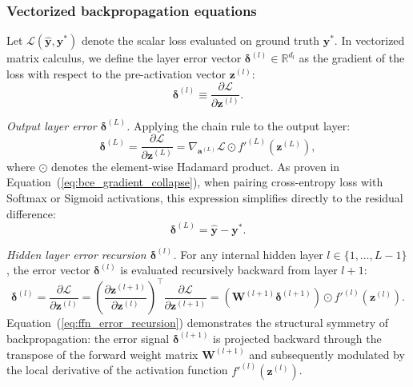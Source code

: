 \documentclass[../../main.tex]{subfiles}
\begin{document}
\subsubsection{Vectorized backpropagation equations}

Let $\mathcal{L}(\hat{\mathbf{y}}, \mathbf{y}^*)$ denote the scalar loss evaluated on ground truth $\mathbf{y}^*$. In vectorized matrix calculus, we define the layer error vector $\bm{\delta}^{(l)} \in \mathbb{R}^{d_l}$ as the gradient of the loss with respect to the pre-activation vector $\mathbf{z}^{(l)}$:
\begin{equation}
\bm{\delta}^{(l)} \equiv \frac{\partial \mathcal{L}}{\partial \mathbf{z}^{(l)}}.
\end{equation}

\textit{Output layer error $\bm{\delta}^{(L)}$.} Applying the chain rule to the output layer:
\begin{equation}
\bm{\delta}^{(L)} = \frac{\partial \mathcal{L}}{\partial \mathbf{z}^{(L)}} = \nabla_{\mathbf{a}^{(L)}} \mathcal{L} \odot f'^{(L)}\left(\mathbf{z}^{(L)}\right),
\end{equation}
where $\odot$ denotes the element-wise Hadamard product. As proven in Equation~(\ref{eq:bce_gradient_collapse}), when pairing cross-entropy loss with Softmax or Sigmoid activations, this expression simplifies directly to the residual difference:
\begin{equation}
\bm{\delta}^{(L)} = \hat{\mathbf{y}} - \mathbf{y}^*.
\end{equation}

\textit{Hidden layer error recursion $\bm{\delta}^{(l)}$.} For any internal hidden layer $l \in \{1, \dots, L-1\}$, the error vector $\bm{\delta}^{(l)}$ is evaluated recursively backward from layer $l+1$:
\begin{equation}
\bm{\delta}^{(l)} = \frac{\partial \mathcal{L}}{\partial \mathbf{z}^{(l)}} = \left( \frac{\partial \mathbf{z}^{(l+1)}}{\partial \mathbf{z}^{(l)}} \right)^\top \frac{\partial \mathcal{L}}{\partial \mathbf{z}^{(l+1)}} = \left( \mathbf{W}^{(l+1)} \bm{\delta}^{(l+1)} \right) \odot f'^{(l)}\left(\mathbf{z}^{(l)}\right).
\label{eq:ffn_error_recursion}
\end{equation}
Equation~(\ref{eq:ffn_error_recursion}) demonstrates the structural symmetry of backpropagation: the error signal $\bm{\delta}^{(l+1)}$ is projected backward through the transpose of the forward weight matrix $\mathbf{W}^{(l+1)}$ and subsequently modulated by the local derivative of the activation function $f'^{(l)}(\mathbf{z}^{(l)})$.
\end{document}
